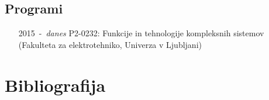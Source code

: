 \documentclass[a4paper,twoside,11pt]{article}
\begin{document}
	\subsection*{Programi}
	\begin{itemize}[align=left, itemsep=-0.1cm, leftmargin=2.5cm, labelwidth=*]
		\item[2015~-~\textit{danes}] P2-0232: Funkcije in tehnologije kompleksnih sistemov (Fakulteta za elektrotehniko, Univerza v Ljubljani)
	\end{itemize}
	

	
	
	\newpage
	\section{Bibliografija}
\end{document}
